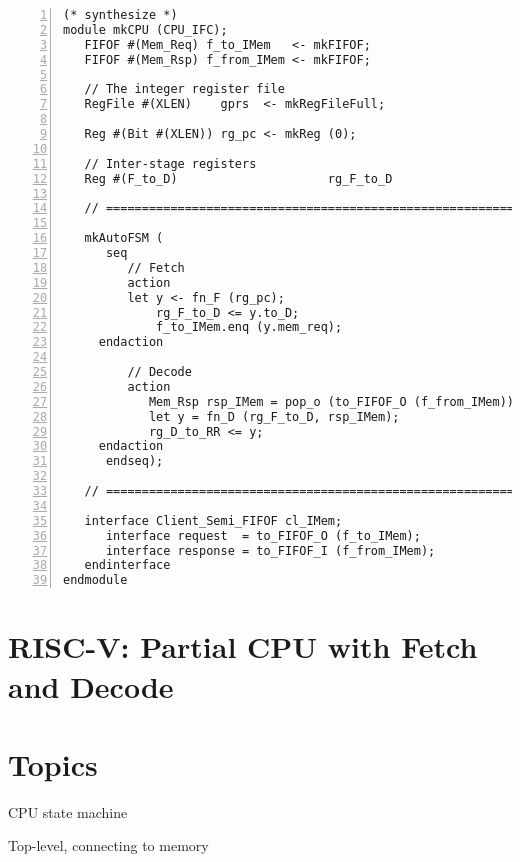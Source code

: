 \begin{Verbatim}[frame=single, numbers=left]
(* synthesize *)
module mkCPU (CPU_IFC);
   FIFOF #(Mem_Req) f_to_IMem   <- mkFIFOF;
   FIFOF #(Mem_Rsp) f_from_IMem <- mkFIFOF;

   // The integer register file
   RegFile #(XLEN)    gprs  <- mkRegFileFull;

   Reg #(Bit #(XLEN)) rg_pc <- mkReg (0);

   // Inter-stage registers
   Reg #(F_to_D)                     rg_F_to_D                  <- mkRegU;

   // ================================================================

   mkAutoFSM (
      seq
         // Fetch
         action
	     let y <- fn_F (rg_pc);
             rg_F_to_D <= y.to_D;
             f_to_IMem.enq (y.mem_req);
	 endaction

         // Decode
         action
            Mem_Rsp rsp_IMem = pop_o (to_FIFOF_O (f_from_IMem));
            let y = fn_D (rg_F_to_D, rsp_IMem);
            rg_D_to_RR <= y;
	 endaction
      endseq);

   // ================================================================

   interface Client_Semi_FIFOF cl_IMem;
      interface request  = to_FIFOF_O (f_to_IMem);
      interface response = to_FIFOF_I (f_from_IMem);
   endinterface
endmodule

\end{Verbatim}


\section{RISC-V: Partial CPU with Fetch and Decode}



\section{Topics}

\begin{tightlist}

\item CPU state machine

\item Top-level, connecting to memory

\end{tightlist}

